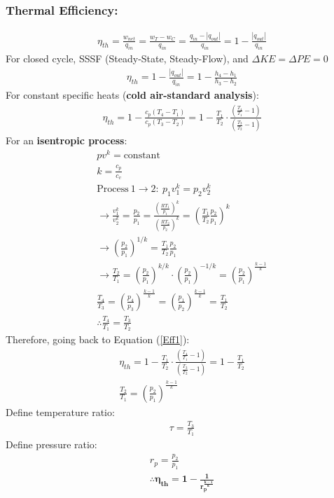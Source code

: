 \documentclass[class=report, crop=false, 12pt,a4paper]{standalone}
\numberwithin{equation}{section}
\begin{document}
\subsubsection{Thermal Efficiency:}
\begin{gather}
  \eta_{th} = \frac{w_{net}}{q_{in}} = \frac{w_T - w_C}{q_{in}} = \frac{q_{in} - |q_{out}|}{q_{in}} = 1 - \frac{|q_{out}|}{q_{in}}
\end{gather}
For closed cycle, SSSF (Steady-State, Steady-Flow), and $\Delta KE = \Delta PE = 0$
\begin{gather}
  \eta_{th} = 1-\frac{|q_{out}|}{q_{in}} = 1-\frac{h_4-h_1}{h_3-h_2}
\end{gather}
For constant specific heats (\textbf{cold air-standard analysis}):
\begin{gather}
  \eta_{th} = 1-\frac{c_p(T_4-T_1)}{c_p(T_3-T_2)} = 1-\frac{T_1}{T_2}\cdot\frac{\left(\frac{T_4}{T_1}-1\right)}{\left(\frac{T_3}{T_2}-1\right)}
  \label{Eff1}
\end{gather}
For an \textbf{isentropic process}:
\begin{gather}
  pv^k = \text{constant} \\[5pt]
  k = \frac{c_p}{c_v} \\[5pt]
  \text{Process}\ 1\longrightarrow 2: \ p_1v_1^k = p_2v_2^k \\[5pt]
  \longrightarrow \frac{v_1^k}{v_2^k} = \frac{p_2}{p_1} = \frac{\left(\frac{RT_1}{p_1}\right)^k}{\left(\frac{RT_2}{p_2}\right)^k} = \left(\frac{T_1}{T_2}\frac{p_2}{p_1}\right)^k \\[5pt]
  \longrightarrow \left(\frac{p_2}{p_1}\right)^{1/k} = \frac{T_1}{T_2}\frac{p_2}{p_1} \\[5pt]
  \longrightarrow \frac{T_2}{T_1} = \left(\frac{p_2}{p_1}\right)^{k/k}\cdot\left(\frac{p_2}{p_1}\right)^{-1/k} = \left(\frac{p_2}{p_1}\right)^{\frac{k-1}{k}} \\[5pt]
  \frac{T_4}{T_3} = \left(\frac{p_4}{p_3}\right)^{\frac{k-1}{k}} = \left(\frac{p_1}{p_2}\right)^{\frac{k-1}{k}} = \frac{T_1}{T_2} \\[5pt]
  \therefore \frac{T_4}{T_1} = \frac{T_3}{T_2}
\end{gather}
Therefore, going back to Equation (\ref{Eff1}): 
\begin{gather}
  \eta_{th} = 1-\frac{T_1}{T_2}\cdot\frac{\left(\frac{T_4}{T_1}-1\right)}{\left(\frac{T_3}{T_2}-1\right)} = 1-\frac{T_1}{T_2} \\[5pt]
  \frac{T_2}{T_1} = \left(\frac{p_2}{p_1}\right)^{\frac{k-1}{k}}
\end{gather}
Define temperature ratio:
\begin{gather}
  \tau = \frac{T_3}{T_1}
\end{gather}
Define pressure ratio: 
\begin{gather}
  r_p = \frac{p_2}{p_1} \\[5pt]
  \mathbf{\therefore \eta_{th} = 1-\frac{1}{r_p^{\frac{k-1}{k}}}}
\end{gather}
\end{document}
